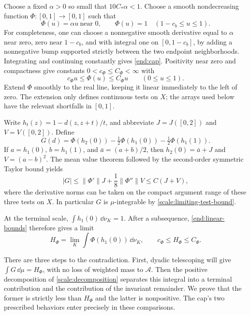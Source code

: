 Choose a fixed $\alpha>0$ so small that $10C_*\alpha<1$.  Choose a smooth
nondecreasing function $\Phi:[0,1]\to[0,1]$ such that
\begin{equation}\label{end:cap}
 \Phi(u)=\alpha u\ \text{near }0,\qquad
 \Phi(u)=1\quad(1-c_b\le u\le1).
\end{equation}
For completeness, one can choose a nonnegative smooth derivative equal
to $\alpha$ near zero, zero near $1-c_b$, and with integral one on
$[0,1-c_b]$, by adding a nonnegative bump supported strictly between the
two endpoint neighborhoods.  Integrating and continuing constantly gives
\cref{end:cap}.  Positivity near zero and compactness give constants
$0<c_\Phi\le C_\Phi<\infty$ with
\begin{equation}\label{end:linear-bounds}
 c_\Phi u\le\Phi(u)\le C_\Phi u\qquad(0\le u\le1).
\end{equation}
Extend $\Phi$ smoothly to the real line, keeping it linear immediately
to the left of zero.  The extension only defines continuous tests on
$X$; the arrays used below have the relevant shortfalls in $[0,1]$.

Write $h_t(z)=1-d(z,z+t)/t$, and abbreviate $J=J([0,2])$ and
$V=V([0,2])$.  Define
\begin{equation}\label{end:G-definition}
 G(d)=\Phi(h_2(0))-\tfrac12\Phi(h_1(0))-\tfrac12\Phi(h_1(1)).
\end{equation}
If $a=h_1(0)$, $b=h_1(1)$, and $\bar a=(a+b)/2$, then
$h_2(0)=\bar a+J$ and $V=(a-b)^2$.  The mean value theorem followed by
the second-order symmetric Taylor bound yields
\begin{equation}\label{end:G-bound}
 |G|\le\|\Phi'\|J+\frac18\|\Phi''\|V\le C(J+V),
\end{equation}
where the derivative norms can be taken on the compact argument range
of these three tests on $X$.  In particular $G$ is $\mu$-integrable by
\cref{scale:limiting-test-bound}.

At the terminal scale, $\int h_1(0)\,\dd\nu_K=1$.  After a subsequence,
\cref{end:linear-bounds} therefore gives a limit
\begin{equation}\label{end:H-definition}
H_\Phi=\lim_K\int\Phi(h_1(0))\,\dd\nu_K,
 \qquad c_\Phi\le H_\Phi\le C_\Phi.
\end{equation}

There are three steps to the contradiction. First, dyadic telescoping
will give $\int G\,\dd\mu=H_\Phi$, with no loss of weighted mass to
$\mathcal A$. Then the positive decomposition of
\cref{scale:decomposition} separates this integral into a terminal
contribution and the contribution of the invariant remainder. We prove
that the former is strictly less than $H_\Phi$ and the latter is
nonpositive. The cap's two prescribed behaviors enter precisely in
these comparisons.


